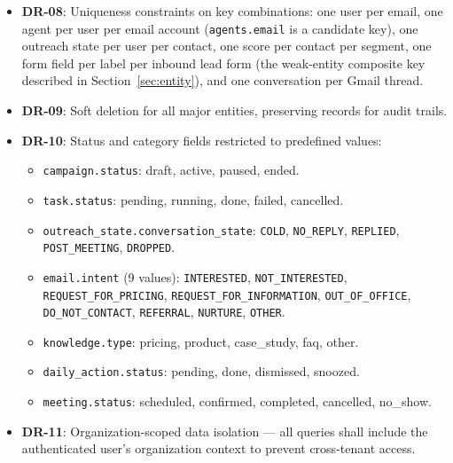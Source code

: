 \documentclass[a4paper]{article}
\begin{document}
\begin{itemize}
    \item \textbf{DR-08}: Uniqueness constraints on key
    combinations: one user per email, one agent per user per
    email account (\texttt{agents.email} is a candidate key),
    one outreach state per user per contact, one score per
    contact per segment, one form field per label per inbound
    lead form (the weak-entity composite key described in
    Section~\ref{sec:entity}), and one conversation per Gmail
    thread.

    \item \textbf{DR-09}: Soft deletion for all major entities,
    preserving records for audit trails.

    \item \textbf{DR-10}: Status and category fields restricted
    to predefined values:
    \begin{itemize}[nosep,leftmargin=*]
        \item \texttt{campaign.status}: draft, active, paused,
          ended.
        \item \texttt{task.status}: pending, running, done,
          failed, cancelled.
        \item \texttt{outreach\_state.conversation\_state}:
          \texttt{COLD}, \texttt{NO\_REPLY}, \texttt{REPLIED},
          \texttt{POST\_MEETING}, \texttt{DROPPED}.
        \item \texttt{email.intent} (9 values):
          \texttt{INTERESTED}, \texttt{NOT\_INTERESTED},
          \texttt{REQUEST\_FOR\_PRICING},
          \texttt{REQUEST\_FOR\_INFORMATION},
          \texttt{OUT\_OF\_OFFICE},
          \texttt{DO\_NOT\_CONTACT}, \texttt{REFERRAL},
          \texttt{NURTURE}, \texttt{OTHER}.
        \item \texttt{knowledge.type}: pricing, product,
          case\_study, faq, other.
        \item \texttt{daily\_action.status}: pending, done,
          dismissed, snoozed.
        \item \texttt{meeting.status}: scheduled, confirmed,
          completed, cancelled, no\_show.
    \end{itemize}

    \item \textbf{DR-11}: Organization-scoped data isolation
    --- all queries shall include the authenticated user's
    organization context to prevent cross-tenant access.
\end{itemize}
\end{document}
